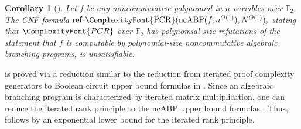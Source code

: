 \documentclass[11pt,letter]{article}
\newtheorem{corollary}[theorem]{Corollary}
\theoremstyle{remark} %
\newcommand{\RankP}{\mathrm{RankP}} %
\newcommand{\TRankP}{\mathrm{TRankP}} %
\newcommand{\PCR}{ %
    {
        \ComplexityFont{PCR}
    }
}
\newcommand{\F}{\mathbb{F}}
\begin{document}
{\begin{corollary}[\cite{GGRT25}]
    \label{cor: ncABP}
        Let $f$ be any noncommutative polynomial in $n$ variables over $\F_2$.
        The CNF formula      
        $%
        {\rm ref\text{-}\PCR}%
        ({\rm ncABP}(%
                        f, n^{O(1)}
                    )%
        , N^{O(1)}%
        ),%
        $ stating that $\PCR$ over $\F_2$ has polynomial-size refutations of the statement that $f$ is computable by polynomial-size noncommutative algebraic branching programs, is unsatisfiable. 
\end{corollary}

 is proved via a reduction similar to the reduction from iterated proof complexity generators to Boolean circuit upper bound formulas in \cite{Razb15-annals}. Since an algebraic branching program is characterized by iterated matrix multiplication, one can reduce the iterated rank principle to the ncABP upper bound formulas \cite{GGRT25}. Thus,  follows by an exponential lower bound for the iterated rank principle.








}
\end{document}
